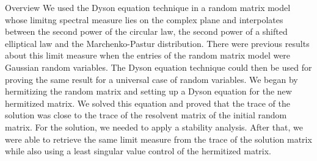 \documentclass[11pt, a4paper, oneside]{book}
\numberwithin{equation}{chapter}
\begin{document}
\begin{section}{Overview}
We used the Dyson equation technique in a random matrix model whose limitng spectral measure lies on the complex plane and interpolates between the second power of the circular law, the second power of a shifted elliptical law and the Marchenko-Pastur distribution. There were previous results about this limit measure when the entries of the random matrix model were Gaussian random variables. The Dyson equation technique could then be used for proving the same result for a universal case of random variables. We began by hermitizing the random matrix and setting up a Dyson equation for the new hermitized matrix. We solved this equation and proved that the trace of the solution was close to the trace of the resolvent matrix of the initial random matrix. For the solution, we needed to apply a stability analysis. After that, we were able to retrieve the same limit measure from the trace of the solution matrix while also using a least singular value control of the hermitized matrix.
\end{section}
\newpage
\end{document}
